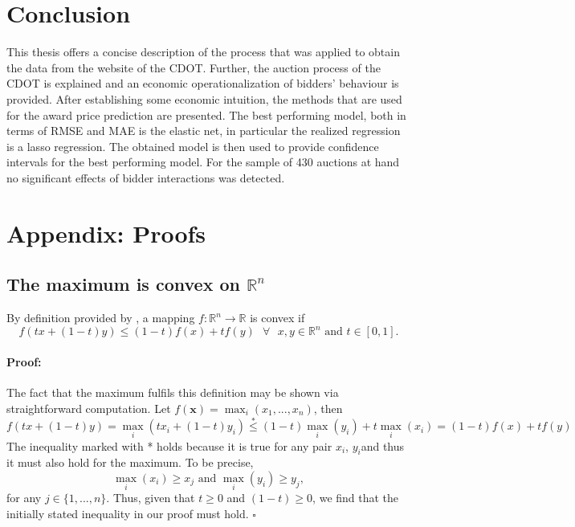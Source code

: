\documentclass[a4paper,12pt, headsepline]{scrartcl}
\DeclareMathOperator*{\maxA}{max}
\newenvironment{proof}{\paragraph{Proof:}}{\hfill$\square$}
\numberwithin{equation}{section}
\begin{document}
\section{Conclusion}\label{sec:con}
 This thesis offers a concise description of the process that was applied to obtain the data from the website of the CDOT. Further, the auction process of the CDOT is explained and an economic operationalization of bidders' behaviour is provided. After establishing some economic intuition, the methods that are used for the award price prediction are presented. The best performing model, both in terms of RMSE and MAE is the elastic net, in particular the realized regression is a lasso regression. The obtained model is then used to provide confidence intervals for the best performing model. For the sample of 430 auctions at hand no significant effects of bidder interactions was detected.
 \newpage
 \printbibliography
 \newpage
 \appendix
 \section{Appendix: Proofs}
 \subsection{The maximum is convex on $\mathbb{R}^n$}\label{App:A1}
 By definition provided by \citet{rudin76}, a mapping $f: \mathbb{R}^n \rightarrow \mathbb{R}$ is convex if
 \[
 f(tx+ (1-t)y) \leq (1-t)f(x)+tf(y) \text{ }\forall\text{ } x, y \in \mathbb{R}^n \text{ and } t \in [0, 1].
 \]
 \begin{proof}
 The fact that the maximum fulfils this definition may be shown via straightforward computation. 
 Let $f(\bm{x}) = \maxA_i(x_1, ..., x_n)$, then 
 \[
  f(tx+ (1-t)y) = \maxA_i(tx_i + (1-t)y_i) \overset{*}{\leq} (1-t)\maxA_i(y_i) + t\maxA_i(x_i) = (1-t)f(x)+tf(y)
 \]
 The inequality marked with * holds because it is true for any pair $x_i$, $y_i$and thus it must also hold for the maximum. To be precise,
 \[
  \maxA_i(x_i) \geq x_j \text{ and } \maxA_i(y_i) \geq y_j,
 \]
for any $j \in \{1, ..., n\}$. Thus, given that $t \geq 0$ and $(1-t) \geq 0$, we find that the initially stated inequality in our proof must hold.
\end{proof}
\end{document}
